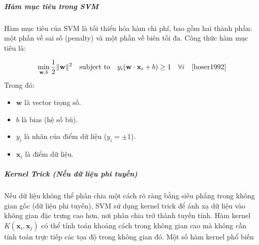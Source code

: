 \documentclass[a4paper,12pt]{article}
\begin{document}
\subparagraph{Hàm mục tiêu trong SVM}  
\hspace{5mm}Hàm mục tiêu của SVM là tối thiểu hóa hàm chi phí, bao gồm hai thành phần: một phần về sai số (penalty) và một phần về biên tối đa. Công thức hàm mục tiêu là:

\[
\min_{\mathbf{w}, b} \frac{1}{2} \|\mathbf{w}\|^2 \quad \text{subject to} \quad y_i (\mathbf{w} \cdot \mathbf{x}_i + b) \geq 1 \quad \forall i
\quad \text{\cite{boser1992}}
\]
Trong đó:
\begin{itemize}
    \item \(\mathbf{w}\) là vector trọng số.
    \item \(b\) là bias (hệ số bù).
    \item \(y_i\) là nhãn của điểm dữ liệu (\(y_i = \pm 1\)).
    \item \(\mathbf{x}_i\) là điểm dữ liệu.
\end{itemize}

\subparagraph{Kernel Trick (Nếu dữ liệu phi tuyến)}  
\hspace{5mm}Nếu dữ liệu không thể phân chia một cách rõ ràng bằng siêu phẳng trong không gian gốc (dữ liệu phi tuyến), SVM sử dụng kernel trick để ánh xạ dữ liệu vào không gian đặc trưng cao hơn, nơi phân chia trở thành tuyến tính. Hàm kernel \(K(\mathbf{x}_i, \mathbf{x}_j)\) có thể tính toán khoảng cách trong không gian cao mà không cần tính toán trực tiếp các tọa độ trong không gian đó. Một số hàm kernel phổ biến \cite{svm_kernel}
\end{document}
